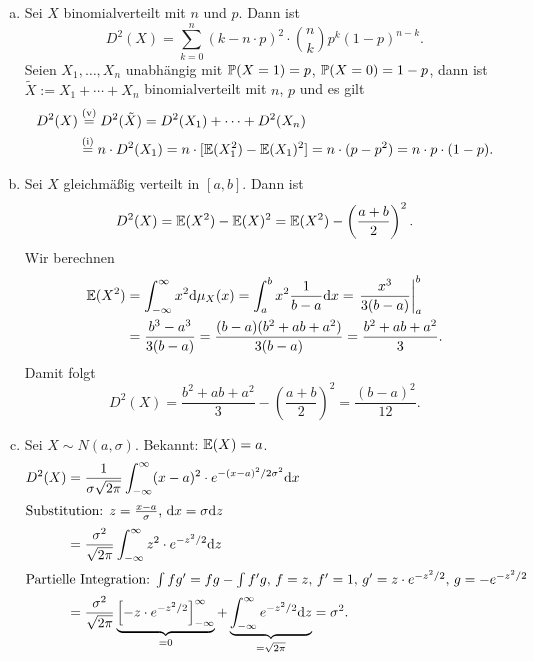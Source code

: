 \begin{exmp}
  \begin{enumerate}[(a)]
  \item Sei $X$ binomialverteilt mit $n$ und $p$. Dann ist
    \[ D^2(X) = \sum_{k=0}^n (k-n \cdot p)^2 \cdot \binom{n}{k} p^k
      (1-p)^{n-k}. \]
    Seien $X_1, \ldots, X_n$ unabhängig mit $\mathbb{P}(X=1) = p$, $\mathbb{P}(X=0) = 1-p$,
    dann ist $\tilde{X} := X_1 + \cdots + X_n$ binomialverteilt mit $n$, $p$ und
    es gilt
    \begin{align*}
      D^2(X)
      & \overset{(\text{v})}{=} D^2(\tilde{X}) = D^2(X_1) + \cdots + D^2(X_n) \\
      & \overset{(\text{i})}{=} n \cdot D^2(X_1) = n \cdot [ \mathbb{E}(X_1^2) - \mathbb{E}(X_1)^2 ]
        = n \cdot (p - p^2) = n \cdot p \cdot (1-p).
    \end{align*}
  \item Sei $X$ gleichmäßig verteilt in $[a,b]$. Dann ist
    \[ D^2(X) = \mathbb{E}(X^2) - \mathbb{E}(X)^2 = \mathbb{E}(X^2) - \left(  \frac{a+b}{2}
      \right)^2. \]
    Wir berechnen
    \[ \begin{aligned}
        \mathbb{E}(X^2)
        & = \int_{-\infty}^\infty x^2 \mathrm{d} \mu_X(x) = \int_a^b x^2
        \frac{1}{b-a} \mathrm{d} x = \left. \frac{x^3}{3(b-a)} \right|_a^b \\
        & = \frac{b^3 - a^3}{3(b-a)} = \frac{(b-a)(b^2 + ab + a^2)}{3(b-a)} =
        \frac{b^2 + ab + a^2}{3}.
      \end{aligned} \]
    Damit folgt
    \[ D^2(X) = \frac{b^2 + ab + a^2}{3} - \left( \frac{a+b}{2} \right)^2
      = \frac{(b-a)^2}{12}. \]
  \item Sei $X \sim N(a,\sigma)$. Bekannt: $\mathbb{E}(X) = a$.
    \begin{align*}
      D^2(X)
      &= \frac{1}{\sigma \sqrt{2 \pi}} \int_{-\infty}^\infty (x-a)^2 \cdot e^{-(x-a)^2 / 2
        \sigma^2} \mathrm{d} x \\
      \intertext{Substitution: $z = \frac{x-a}{\sigma}$, $\mathrm{d} x = \sigma \mathrm{d} z$}
      &= \frac{\sigma^2}{\sqrt{2 \pi}} \int_{-\infty}^\infty z^2 \cdot e^{-z^2 / 2} \mathrm{d} z \\
      \intertext{Partielle Integration: $\int fg' = fg - \int f'g$, $f = z$, $f'=1$, $g' = z \cdot e^{-z^2 / 2}$, $g = - e^{-z^2 / 2}$}
      &= \frac{\sigma^2}{\sqrt{2 \pi}}
        \underbrace{\left[ -z \cdot e^{-z^2 / 2} \right]_{-\infty}^\infty}_{=0} +
        \underbrace{\int_{-\infty}^\infty e^{-z^2 / 2} \mathrm{d} z}_{=\sqrt{2 \pi}} = \sigma^2.
    \end{align*}
  \end{enumerate}
\end{exmp}

